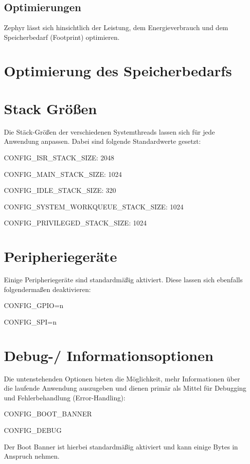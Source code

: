 \subsection{Optimierungen}

Zephyr lässt sich hinsichtlich der Leistung, dem Energieverbrauch und dem Speicherbedarf (Footprint) optimieren.

\section{Optimierung des Speicherbedarfs}

\section{Stack Größen}

Die Stäck-Größen der verschiedenen Systemthreads lassen sich für jede Anwendung anpassen. Dabei sind folgende Standardwerte gesetzt:

CONFIG\_ISR\_STACK\_SIZE: 2048

CONFIG\_MAIN\_STACK\_SIZE: 1024

CONFIG\_IDLE\_STACK\_SIZE: 320

CONFIG\_SYSTEM\_WORKQUEUE\_STACK\_SIZE: 1024

CONFIG\_PRIVILEGED\_STACK\_SIZE: 1024

\section{Peripheriegeräte}

Einige Peripheriegeräte sind standardmäßig aktiviert. Diese lassen sich ebenfalls folgendermaßen deaktivieren:

CONFIG\_GPIO=n

CONFIG\_SPI=n

\section{Debug-/ Informationsoptionen}

Die untenstehenden Optionen bieten die Möglichkeit, mehr Informationen über die laufende Anwendung auszugeben und dienen primär als Mittel für Debugging und Fehlerbehandlung (Error-Handling):

CONFIG\_BOOT\_BANNER

CONFIG\_DEBUG

Der Boot Banner ist hierbei standardmäßig aktiviert und kann einige Bytes in Anspruch nehmen.


